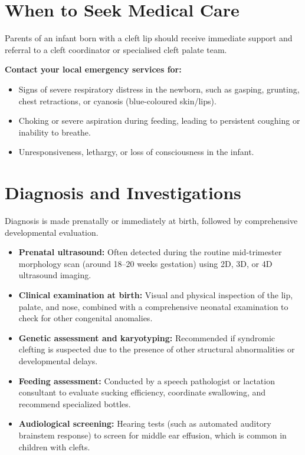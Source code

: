 \section*{When to Seek Medical Care}
Parents of an infant born with a cleft lip should receive immediate support and referral to a cleft coordinator or specialised cleft palate team.

\textbf{Contact your local emergency services for:}
\begin{itemize}
    \item Signs of severe respiratory distress in the newborn, such as gasping, grunting, chest retractions, or cyanosis (blue-coloured skin/lips).
    \item Choking or severe aspiration during feeding, leading to persistent coughing or inability to breathe.
    \item Unresponsiveness, lethargy, or loss of consciousness in the infant.
\end{itemize}

\section*{Diagnosis and Investigations}
Diagnosis is made prenatally or immediately at birth, followed by comprehensive developmental evaluation.
\begin{itemize}
    \item \textbf{Prenatal ultrasound:} Often detected during the routine mid-trimester morphology scan (around 18--20 weeks gestation) using 2D, 3D, or 4D ultrasound imaging.
    \item \textbf{Clinical examination at birth:} Visual and physical inspection of the lip, palate, and nose, combined with a comprehensive neonatal examination to check for other congenital anomalies.
    \item \textbf{Genetic assessment and karyotyping:} Recommended if syndromic clefting is suspected due to the presence of other structural abnormalities or developmental delays.
    \item \textbf{Feeding assessment:} Conducted by a speech pathologist or lactation consultant to evaluate sucking efficiency, coordinate swallowing, and recommend specialized bottles.
    \item \textbf{Audiological screening:} Hearing tests (such as automated auditory brainstem response) to screen for middle ear effusion, which is common in children with clefts.
\end{itemize}

